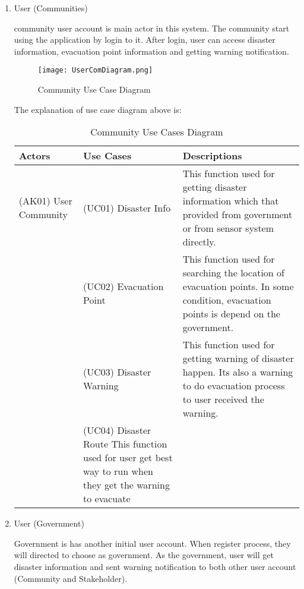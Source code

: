 \begin{enumerate}
\item User (Communities)\par 
community user account is main actor in this system. The community start using the application by login to it. After login, user can access disaster information, evacuation point information and getting warning notification.  
\begin{figure}[H]
\centering
\texttt{[image: UserComDiagram.png]}
\label{fig:comUseCase}
\caption{Community Use Case Diagram}
\end{figure}

The explanation of use case  diagram above is:
\begin{table}[H]
\begin{center}
\caption{Community Use Cases Diagram}
\label{tab: ComUCDiagram}
	\vspace{0.1cm}
\begin{tabular}{ |>{\centering\arraybackslash}m{2cm}|>{\centering\arraybackslash}m{4cm}|>{\centering\arraybackslash}m{6.5cm}|}
 \hline
 \textbf{Actors} & \textbf{Use Cases} & \textbf{Descriptions} \\
 \hline \hline
  (AK01) User Community & (UC01) Disaster Info & This function used for getting disaster information which that provided from government or from sensor system directly. \\
 \hline 
 & (UC02) Evacuation Point & This function used for searching the location of evacuation points. In some condition, evacuation points is depend on the government. \\
 \hline
 & (UC03) Disaster Warning & This function used for getting warning of disaster happen. Its also a warning to do evacuation process to user received the warning. \\
 \hline 
 & (UC04) Disaster Route This function used for user get best way to run when they get the warning to evacuate& \\
 \hline
\end{tabular}
\end{center}
\end{table}

\item User (Government)\par
Government is has another initial user account. When register process, they will directed to choose as government. As the government, user will get disaster information and sent warning notification to both other user account (Community and Stakeholder).


\end{enumerate}
